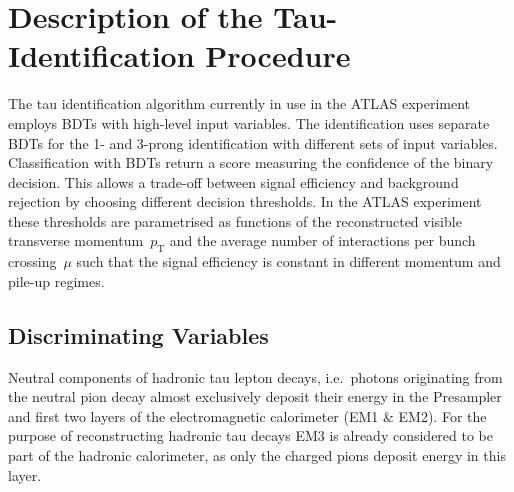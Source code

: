 
\section{Description of the Tau-Identification Procedure}
\label{sec:bdt_tauid}
The tau identification algorithm currently in use in the ATLAS experiment
employs BDTs with high-level input variables. The identification uses separate
BDTs for the 1- and 3-prong identification with different sets of input
variables. Classification with BDTs return a score measuring the confidence of
the binary decision. This allows a trade-off between signal efficiency and
background rejection by choosing different decision thresholds. In the ATLAS
experiment these thresholds are parametrised as functions of the reconstructed
visible transverse momentum~$p_\text{T}$ and the average number of interactions
per bunch crossing~$\mu$ such that the signal efficiency is constant in
different momentum and pile-up regimes.

\subsection{Discriminating Variables}
\label{sec:bdt_features}

Neutral components of hadronic tau lepton decays, i.e.\ photons originating from
the neutral pion decay almost exclusively deposit their energy in the Presampler
and first two layers of the electromagnetic calorimeter (EM1 \& EM2). For the
purpose of reconstructing hadronic tau decays EM3 is already considered to be
part of the hadronic calorimeter, as only the charged pions deposit energy in
this layer.

